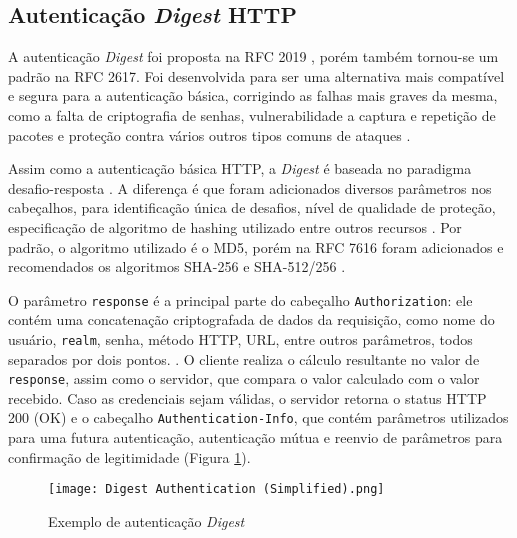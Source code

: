 \subsection{Autenticação \emph{Digest} HTTP}

A autenticação \emph{Digest} foi proposta na RFC 2019 \cite{RFC2019}, porém também tornou-se um 
padrão na RFC 2617. Foi desenvolvida para ser uma alternativa mais compatível e segura  para 
a autenticação básica, corrigindo as falhas mais graves da mesma, como a falta de criptografia de 
senhas, vulnerabilidade a captura e repetição de pacotes e proteção contra vários outros tipos 
comuns de ataques \cite{GOURLEY2002}.

Assim como a autenticação básica HTTP, a \emph{Digest} é baseada no paradigma 
desafio-resposta \cite{RFC7616}. A diferença é que foram adicionados diversos parâmetros nos 
cabeçalhos, para identificação única de desafios, nível de qualidade de proteção, especificação de 
algoritmo de hashing utilizado entre outros recursos \cite{CHAPMAN2012}. Por padrão, o algoritmo 
utilizado é o MD5, porém na RFC 7616 foram adicionados e recomendados os algoritmos SHA-256 e 
SHA-512/256 \cite{RFC7616}.

O parâmetro \texttt{response} é a principal parte do cabeçalho \texttt{Authorization}: ele contém 
uma concatenação criptografada de dados da requisição, como nome do usuário, \texttt{realm}, senha, 
método HTTP, URL, entre outros parâmetros, todos separados por dois pontos. \cite{CHAPMAN2012}. O 
cliente realiza o cálculo resultante no valor de \texttt{response}, assim como o servidor, que 
compara o valor calculado com o valor recebido. Caso as credenciais sejam válidas, o servidor retorna
o status HTTP 200 (OK) e o cabeçalho \texttt{Authentication-Info}, que contém parâmetros utilizados 
para uma futura autenticação, autenticação mútua e reenvio de parâmetros para confirmação de 
legitimidade (Figura \ref{fig:digestAuth}).

\begin{figure}[ht]
  \centering
  \texttt{[image: Digest Authentication (Simplified).png]}
  \caption{Exemplo de autenticação \emph{Digest}}
  \label{fig:digestAuth}
\end{figure}